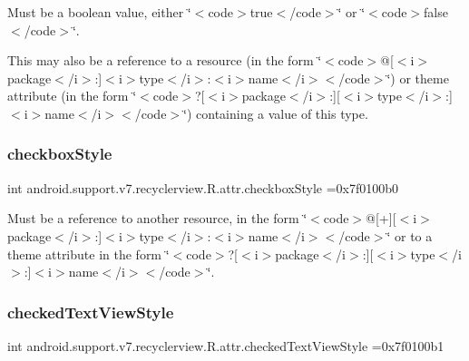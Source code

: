 Must be a boolean value, either \char`\"{}$<$code$>$true$<$/code$>$\char`\"{} or \char`\"{}$<$code$>$false$<$/code$>$\char`\"{}. 

This may also be a reference to a resource (in the form \char`\"{}$<$code$>$@\mbox{[}$<$i$>$package$<$/i$>$\+:\mbox{]}$<$i$>$type$<$/i$>$\+:$<$i$>$name$<$/i$>$$<$/code$>$\char`\"{}) or theme attribute (in the form \char`\"{}$<$code$>$?\mbox{[}$<$i$>$package$<$/i$>$\+:\mbox{]}\mbox{[}$<$i$>$type$<$/i$>$\+:\mbox{]}$<$i$>$name$<$/i$>$$<$/code$>$\char`\"{}) containing a value of this type. \mbox{\label{classandroid_1_1support_1_1v7_1_1recyclerview_1_1R_1_1attr_a6f9c5ed1b6b8021bded1325c40a0a778}} 
\subsubsection{\texorpdfstring{checkbox\+Style}{checkboxStyle}}
{\footnotesize\ttfamily int android.\+support.\+v7.\+recyclerview.\+R.\+attr.\+checkbox\+Style =0x7f0100b0\hspace{0.3cm}{\ttfamily [static]}}

Must be a reference to another resource, in the form \char`\"{}$<$code$>$@\mbox{[}+\mbox{]}\mbox{[}$<$i$>$package$<$/i$>$\+:\mbox{]}$<$i$>$type$<$/i$>$\+:$<$i$>$name$<$/i$>$$<$/code$>$\char`\"{} or to a theme attribute in the form \char`\"{}$<$code$>$?\mbox{[}$<$i$>$package$<$/i$>$\+:\mbox{]}\mbox{[}$<$i$>$type$<$/i$>$\+:\mbox{]}$<$i$>$name$<$/i$>$$<$/code$>$\char`\"{}. \mbox{\label{classandroid_1_1support_1_1v7_1_1recyclerview_1_1R_1_1attr_ade061a8ea58742cf355af7a0056e6181}} 
\subsubsection{\texorpdfstring{checked\+Text\+View\+Style}{checkedTextViewStyle}}
{\footnotesize\ttfamily int android.\+support.\+v7.\+recyclerview.\+R.\+attr.\+checked\+Text\+View\+Style =0x7f0100b1\hspace{0.3cm}{\ttfamily [static]}}

